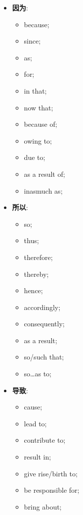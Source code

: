   \begin{multicols}{3}
    \begin{itemize}
      \item \textbf{因为}:
      \begin{itemize}
        \item because;
        \item since;
        \item as;
        \item for;
        \item in that;
        \item now that;
        \item because of;
        \item owing to;
        \item due to;
        \item as a result of;
        \item inasmuch as;
      \end{itemize}

      \item \textbf{所以}:
      \begin{itemize}
        \item so;
        \item thus;
        \item therefore;
        \item thereby;
        \item hence;
        \item accordingly;
        \item consequently;
        \item as a result;
        \item so/such that;
        \item so…as to;
      \end{itemize}

      \item \textbf{导致}:
      \begin{itemize}
        \item cause;
        \item lead to;
        \item contribute to;
        \item result in;
        \item give rise/birth to;
        \item be responsible for;
        \item bring about;
      \end{itemize}


\end{itemize}
\end{multicols}
